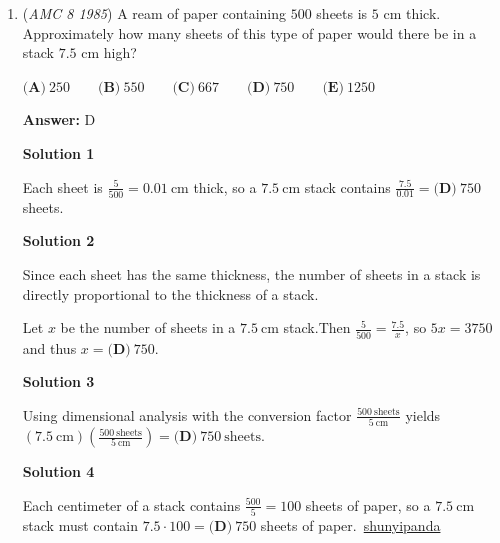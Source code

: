 \begin{enumerate}
 



\textbf{Solution 2}

Of $5 + 4 + 3 + 3 + 5 = 20$ students in the class, $5$ did not receive satisfactory grades.  That is, $\frac{5}{20} = \frac{1}{4}$ of the students did not receive satisfactory grades, and thus $1 - \frac{1}{4} = \boxed{\textbf{(C)}\ \frac{3}{4}}$ did.

 


	\item (\textit{AMC 8 1985}) A ream of paper containing $500$ sheets is $5$ cm thick. Approximately how many sheets of this type of paper would there be in a stack $7.5$ cm high?


 $\textbf{(A)}\ 250 \qquad \textbf{(B)}\ 550 \qquad \textbf{(C)}\ 667 \qquad \textbf{(D)}\ 750 \qquad \textbf{(E)}\ 1250$

 \textbf{Answer: }D



\textbf{Solution 1}

Each sheet is $\frac{5}{500} = 0.01\ \text{cm}$ thick, so a $7.5\ \text{cm}$ stack contains $\frac{7.5}{0.01} = \boxed{\textbf{(D)}\ 750}$ sheets.

 



\textbf{Solution 2}

Since each sheet has the same thickness, the number of sheets in a stack is directly proportional to the thickness of a stack.  

 Let $x$ be the number of sheets in a $7.5\ \text{cm}$ stack.Then $\frac{5}{500}=\frac{7.5}{x}$, so $5x=3750$ and thus $x = \boxed{\textbf{(D)}\ 750}$.

 



\textbf{Solution 3}

Using dimensional analysis with the conversion factor $\frac{500\ \text{sheets}}{5\ \text{cm}}$ yields $(7.5\ \text{cm})\left(\frac{500\ \text{sheets}}{5\ \text{cm}}\right) = \boxed{\textbf{(D)}\ 750}\ \text{sheets}$.

 



\textbf{Solution 4}

Each centimeter of a stack contains $\frac{500}{5} = 100$ sheets of paper, so a $7.5\ \text{cm}$ stack must contain $7.5 \cdot 100 = \boxed{\textbf{(D)}\ 750}$ sheets of paper.~\href{https://artofproblemsolving.com/wiki/index.php?title=Shunyipanda&action=edit&redlink=1}{shunyipanda}


\end{enumerate}
